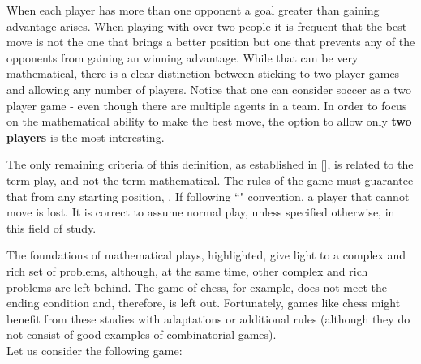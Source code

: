 When each player has more than one opponent a goal greater than gaining advantage arises. When playing with over two people it is frequent that the best move is not the one that brings a better position but one that prevents any of the opponents from gaining an winning advantage. While that can be very mathematical, there is a clear distinction between sticking to two player games and allowing any number of players. Notice that one can consider soccer as a two player game - even though there are multiple agents in a team. In order to focus on the mathematical ability to make the best move, the option to allow only \textbf{two players} is the most interesting.

The only remaining criteria of this definition, as established in [], is related to the term play, and not the term mathematical. The rules of the game must guarantee that from any starting position, . If following ``" convention, a player that cannot move is lost. It is  correct to assume normal play, unless specified otherwise, in this field of study.

The foundations of mathematical plays, highlighted, give light to a complex and rich set of problems, although, at the same time, other complex and rich problems are left behind. The game of chess, for example, does not meet the ending condition and, therefore, is left out. Fortunately, games like chess might benefit from these studies with adaptations or additional rules (although they do not consist of good examples of combinatorial games).\\
Let us consider the following game:\\

\begin{figure} [!ht]
\begin{center}
\end{center}
\caption{}
\end{figure}

